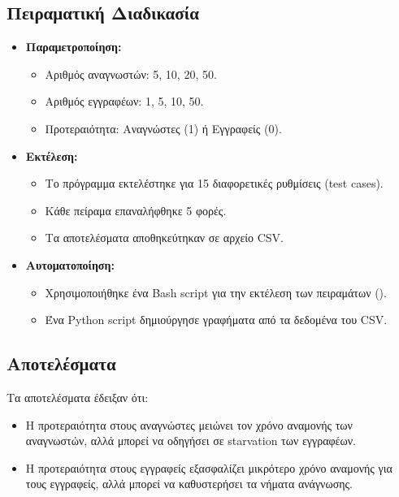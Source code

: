 \documentclass{article}
\begin{document}
\subsection*{Πειραματική Διαδικασία} 
\begin{itemize} 
    \item \textbf{Παραμετροποίηση:} 
    \begin{itemize} 
        \item Αριθμός αναγνωστών: 5, 10, 20, 50. 
        \item Αριθμός εγγραφέων: 1, 5, 10, 50. 
        \item Προτεραιότητα: Αναγνώστες (1) ή Εγγραφείς (0). 
    \end{itemize} 
    \item \textbf{Εκτέλεση:} 
    \begin{itemize} 
        \item Το πρόγραμμα εκτελέστηκε για 15 διαφορετικές ρυθμίσεις (test cases). 
        \item Κάθε πείραμα επαναλήφθηκε 5 φορές. 
        \item Τα αποτελέσματα αποθηκεύτηκαν σε αρχείο CSV. 
    \end{itemize} 
    \item \textbf{Αυτοματοποίηση:} 
    \begin{itemize} 
        \item Χρησιμοποιήθηκε ένα Bash script για την εκτέλεση των πειραμάτων (). 
        \item Ένα Python script δημιούργησε γραφήματα από τα δεδομένα του CSV. 
    \end{itemize} 
\end{itemize}
\subsection*{Αποτελέσματα} 
Τα αποτελέσματα έδειξαν ότι: 
\begin{itemize} 
    \item Η προτεραιότητα στους αναγνώστες μειώνει τον χρόνο αναμονής των αναγνωστών, αλλά μπορεί να οδηγήσει σε starvation των εγγραφέων. 
    \item Η προτεραιότητα στους εγγραφείς εξασφαλίζει μικρότερο χρόνο αναμονής για τους εγγραφείς, αλλά μπορεί να καθυστερήσει τα νήματα ανάγνωσης. 
\end{itemize}
\end{document}
